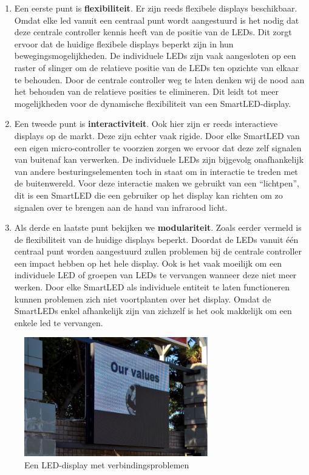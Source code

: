 \documentclass{article}
\begin{document}
\begin{enumerate}


\item Een eerste punt is \textbf{flexibiliteit}. Er zijn reeds flexibele displays beschikbaar. Omdat elke led vanuit een centraal punt wordt aangestuurd is het nodig dat deze centrale controller kennis heeft van de positie van de LEDs. Dit zorgt ervoor dat de huidige flexibele displays beperkt zijn in hun bewegingsmogelijkheden. De individuele LEDs zijn vaak aangesloten op een raster of slinger om de relatieve positie van de LEDs ten opzichte van elkaar te behouden. Door de centrale controller weg te laten denken wij de nood aan het behouden van de relatieve posities te elimineren. Dit leidt tot meer mogelijkheden voor de dynamische flexibiliteit van een SmartLED-display.

\item Een tweede punt is \textbf{interactiviteit}. Ook hier zijn er reeds interactieve displays op de markt. Deze zijn echter vaak rigide. Door elke SmartLED van een eigen micro-controller te voorzien zorgen we ervoor dat deze zelf signalen van buitenaf kan verwerken. De individuele LEDs zijn bijgevolg onafhankelijk van andere besturingselementen toch in staat om in interactie te treden met de buitenwereld. Voor deze interactie maken we gebruikt van een “lichtpen”, dit is een SmartLED die een gebruiker op het display kan richten om zo signalen over te brengen aan de hand van infrarood licht.

\item Als derde en laatste punt bekijken we \textbf{modulariteit}. Zoals eerder vermeld is de flexibiliteit van de huidige displays beperkt. Doordat de LEDs vanuit één centraal punt worden aangestuurd zullen problemen bij de centrale controller een impact hebben op het hele display. Ook is het vaak moeilijk om een individuele LED of groepen van LEDs te vervangen wanneer deze niet meer werken. Door elke SmartLED als individuele entiteit te laten functioneren kunnen problemen zich niet voortplanten over het display. Omdat de SmartLEDs enkel afhankelijk zijn van zichzelf is het ook makkelijk om een enkele led te vervangen.
\end{enumerate}

\begin{figure}[H]
\centering
\includegraphics[width=8cm]{broken.png}
\caption[Een LED-display met verbindingsproblemen]{Een LED-display met verbindingsproblemen \cite{brokenDisplay}}
\end{figure}
\end{document}
